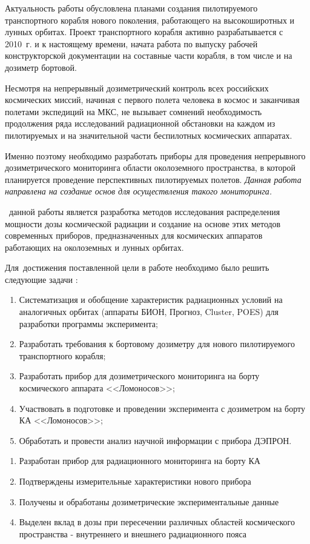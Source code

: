 {\actuality}
 Актуальность работы обусловлена планами создания пилотируемого транспортного корабля нового поколения, работающего на высокоширотных и лунных орбитах. Проект транспортного корабля активно разрабатывается с 2010~г. и к настоящему времени, начата работа по выпуску рабочей конструкторской документации на составные части корабля, в том числе и на дозиметр бортовой.
 
 Несмотря на непрерывный дозиметрический контроль всех российских космических миссий, начиная с первого полета человека в космос и заканчивая полетами экспедиций на МКС, не вызывает сомнений необходимость продолжения ряда исследований радиационной обстановки на каждом из пилотируемых и на значительной части беспилотных космических аппаратах.  
 
 Именно поэтому необходимо разработать приборы  для проведения непрерывного дозиметрического мониторинга области околоземного пространства, в которой планируется проведение перспективных пилотируемых полетов. \textit{Данная работа направлена на создание основ для осуществления такого мониторинга.}

 \aim\ данной работы является разработка методов исследования распределения мощности дозы космической радиации и создание на основе этих методов современных приборов, предназначенных для космических аппаратов работающих на околоземных и лунных орбитах.
  

Для~достижения поставленной цели в работе необходимо было решить следующие задачи {\tasks}:
\begin{enumerate}
  \item Систематизация и обобщение характеристик радиационных условий на аналогичных орбитах (аппараты БИОН, Прогноз, Cluster, POES) для разработки программы эксперимента;
  \item Разработать требования к бортовому дозиметру для нового пилотируемого транспортного корабля;
  \item Разработать прибор для дозиметрического мониторинга на борту космического аппарата <<Ломоносов>>;
  \item Участвовать в подготовке и проведении эксперимента с дозиметром на борту КА <<Ломоносов>>;
  \item Обработать и провести анализ научной информации с прибора ДЭПРОН.
  
\end{enumerate}

\begin{enumerate}
  \item Разработан прибор для радиационного мониторинга на борту КА
  \item Подтверждены измерительные характеристики нового прибора
  \item Получены и обработаны дозиметрические экспериментальные данные
  \item Выделен вклад в дозы при пересечении различных областей космического пространства - внутреннего и внешнего радиационного пояса
\end{enumerate}

